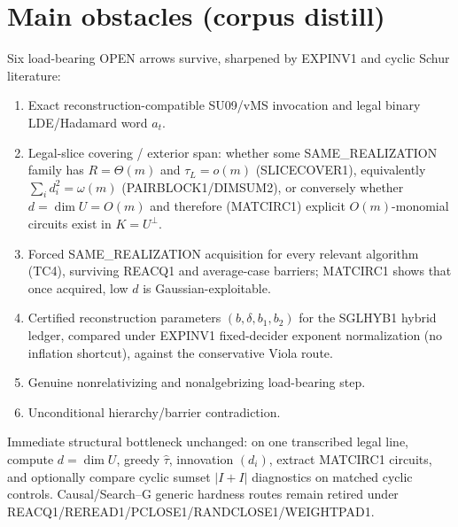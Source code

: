 \documentclass[11pt]{article}
\begin{document}
\section*{Main obstacles (corpus distill)}
Six load-bearing OPEN arrows survive, sharpened by EXPINV1 and cyclic Schur literature:
\begin{enumerate}
\item Exact reconstruction-compatible SU09/vMS invocation and legal binary LDE/Hadamard word $a_t$.
\item Legal-slice covering / exterior span: whether some SAME\_REALIZATION family has
$R=\Theta(m)$ and $\tau_L=o(m)$ (SLICECOVER1), equivalently $\sum_i d_i^2=\omega(m)$
(PAIRBLOCK1/DIMSUM2), or conversely whether $d=\dim U=O(m)$ and therefore (MATCIRC1)
explicit $O(m)$-monomial circuits exist in $K=U^\perp$.
\item Forced SAME\_REALIZATION acquisition for every relevant algorithm (TC4), surviving
REACQ1 and average-case barriers; MATCIRC1 shows that once acquired, low $d$ is
Gaussian-exploitable.
\item Certified reconstruction parameters $(b,\delta,b_1,b_2)$ for the SGLHYB1 hybrid ledger,
compared under EXPINV1 fixed-decider exponent normalization (no inflation shortcut),
against the conservative Viola route.
\item Genuine nonrelativizing and nonalgebrizing load-bearing step.
\item Unconditional hierarchy/barrier contradiction.
\end{enumerate}
Immediate structural bottleneck unchanged: on one transcribed legal line, compute
$d=\dim U$, greedy $\widehat\tau$, innovation $(d_i)$, extract MATCIRC1 circuits, and
optionally compare cyclic sumset $|I+I|$ diagnostics on matched cyclic controls.
Causal/Search--G generic hardness routes remain retired under
REACQ1/REREAD1/PCLOSE1/RANDCLOSE1/WEIGHTPAD1.
\end{document}
